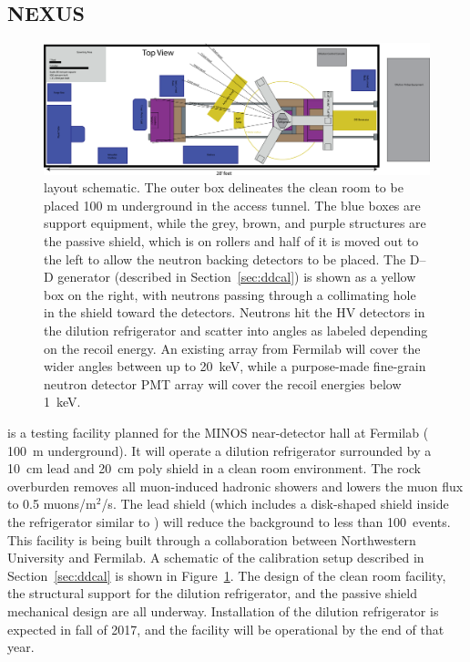 \subsection{NEXUS}
\label{sec:nexus}

\begin{figure}
\centering
\includegraphics[width=\textwidth]{Figures/NEXUS-Layout-YieldMeas}
\caption{\nexus layout schematic. The outer box delineates the clean room to be placed 100 m underground in the \numi access tunnel. The blue boxes are support equipment, while the grey, brown, and purple structures are the passive shield, which is on rollers and half of it is moved out to the left to allow the neutron backing detectors to be placed. The D--D generator (described in Section~\ref{sec:ddcal}) is shown as a yellow box on the right, with neutrons passing through a collimating hole in the shield toward the detectors. Neutrons hit the HV detectors in the dilution refrigerator and scatter into angles as labeled depending on the recoil energy. An existing array from Fermilab will cover the wider angles between up to 20~keV, while a purpose-made fine-grain neutron detector PMT array will cover the recoil energies below 1~keV.\vspace{-2ex}}
\label{fig:nexus}
\end{figure}

\nexus is a testing facility planned for the MINOS near-detector hall at Fermilab ( 100~m underground). It will operate a dilution refrigerator surrounded by a 10~cm lead and 20~cm poly shield in a clean room environment. The rock overburden removes all muon-induced hadronic showers and lowers the muon flux to 0.5 muons/m$^2$/s. The lead shield (which includes a disk-shaped shield inside the refrigerator similar to \cute) will reduce the background to less than 100~events\perkkd. This facility is being built through a collaboration between Northwestern University and Fermilab.  A schematic of the calibration setup described in Section~\ref{sec:ddcal} is shown in Figure~\ref{fig:nexus}. The design of the clean room facility, the structural support for the dilution refrigerator, and the passive shield mechanical design are all underway. Installation of the dilution refrigerator is expected in fall of 2017, and the facility will be operational by the end of that year.


